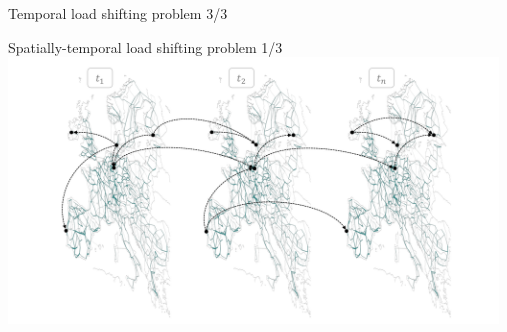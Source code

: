 \begin{frame}{Temporal load shifting problem 3/3}
{  }
\end{frame}


\begin{frame}{Spatially-temporal load shifting problem 1/3}
  \centering
  \vspace{0.3cm}
  \hspace{-0.3cm}\includegraphics[width=13cm]{images/spatial-temporal-vlinks.png}
\end{frame}


